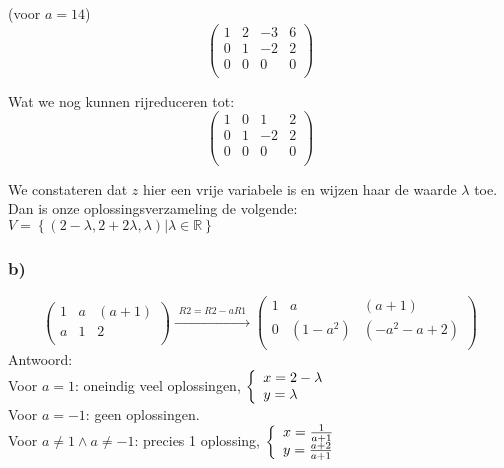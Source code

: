 \documentclass[11pt]{article}
\begin{document}
(voor $a=14$)
\[
\begin{pmatrix}
  1 & 2 & -3 & 6 \\
  0 & 1 & -2 & 2 \\
  0 & 0 & 0 & 0 \\
 \end{pmatrix}
\]

Wat we nog kunnen rijreduceren tot:
\[
\begin{pmatrix}
  1 & 0 & 1 & 2 \\
  0 & 1 & -2 & 2 \\
  0 & 0 & 0 & 0 \\
 \end{pmatrix}
\]

We constateren dat $z$ hier een vrije variabele is en wijzen haar de waarde $\lambda$ toe. Dan is onze oplossingsverzameling de volgende:\\
$ V = \left\{ \left( 2 - \lambda, 2 + 2\lambda, \lambda \right) | \lambda \in \mathbb{R} \right\} $

\subsubsection*{b)}
\[
 \left(
\begin{array}{cc|c}
1 & a & (a+1) \\
a & 1 & 2 \\
\end{array}
\right)
 \overset{\begin{matrix}
  R2 = R2-aR1
 \end{matrix}}{\rightarrow}
 \left(
\begin{array}{cc|c}
1 & a & (a+1) \\
0 & (1-a^2) & (-a^2-a+2) \\
\end{array}
\right)
\]
Antwoord:\\
Voor $a=1$: oneindig veel oplossingen,
$\left\lbrace
\begin{array}{l l}
x = 2- \lambda \\
y = \lambda
\end{array}
\right.$\\
Voor $a=-1$: geen oplossingen.\\
Voor $a \neq 1 \wedge a \neq -1$: precies 1 oplossing,
$\left\lbrace
\begin{array}{l l}
x = \frac{1}{a+1} \\
y = \frac{a+2}{a+1}
\end{array}
\right.$
\end{document}
